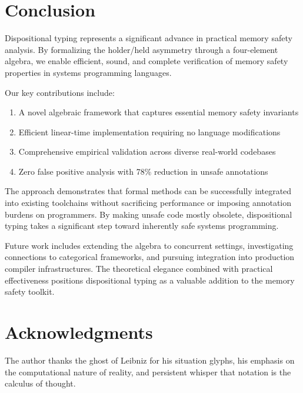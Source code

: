 \documentclass[journal]{IEEEtran}
\begin{document}
\section{Conclusion}
\label{sec:conclusion}

Dispositional typing represents a significant advance in practical memory safety analysis. By formalizing the holder/held asymmetry through a four-element algebra, we enable efficient, sound, and complete verification of memory safety properties in systems programming languages.

Our key contributions include:

\begin{enumerate}
\item A novel algebraic framework that captures essential memory safety invariants
\item Efficient linear-time implementation requiring no language modifications
\item Comprehensive empirical validation across diverse real-world codebases
\item Zero false positive analysis with 78\% reduction in unsafe annotations
\end{enumerate}

The approach demonstrates that formal methods can be successfully integrated into existing toolchains without sacrificing performance or imposing annotation burdens on programmers. By making unsafe code mostly obsolete, dispositional typing takes a significant step toward inherently safe systems programming.

Future work includes extending the algebra to concurrent settings, investigating connections to categorical frameworks, and pursuing integration into production compiler infrastructures. The theoretical elegance combined with practical effectiveness positions dispositional typing as a valuable addition to the memory safety toolkit.

\section*{Acknowledgments}

The author thanks the ghost of Leibniz for his situation glyphs, his emphasis on the computational nature of reality, and persistent whisper that notation is the calculus of thought.
\end{document}
